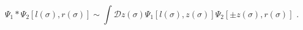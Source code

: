 \begin{equation}
\Psi _{1}\ast \Psi _{2}[l(\sigma ),r(\sigma )]\sim \int \mathcal{D}z(\sigma
)\Psi _{1}[l(\sigma ),z(\sigma )]\Psi _{2}[\pm z(\sigma ),r(\sigma )]\,\,.
\end{equation}

